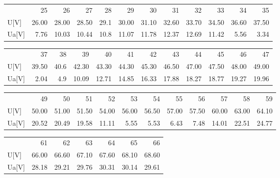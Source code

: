 \documentclass[a4paper,10pt]{article}
\begin{document}
\begin{tabular}{lrrrrrrrrrrr}

{} &     25 &     26 &     27 &    28 &     29 &     30 &     31 &     32 &     33 &     34 &     35 \\

U[V]  &  26.00 &  28.00 &  28.50 &  29.1 &  30.00 &  31.10 &  32.60 &  33.70 &  34.50 &  36.60 &  37.50 \\
Ua[V] &   7.76 &  10.03 &  10.44 &  10.8 &  11.07 &  11.78 &  12.37 &  12.69 &  11.42 &   5.56 &   3.34 \\

\end{tabular}

\begin{tabular}{lrrrrrrrrrrr}

{} &     37 &    38 &     39 &     40 &     41 &     42 &     43 &     44 &     45 &     46 &     47 \\

U[V]  &  39.50 &  40.6 &  42.30 &  43.30 &  44.30 &  45.30 &  46.50 &  47.00 &  47.50 &  48.00 &  49.00 \\
Ua[V] &   2.04 &   4.9 &  10.09 &  12.71 &  14.85 &  16.33 &  17.88 &  18.27 &  18.77 &  19.27 &  19.96 \\

\end{tabular}

\begin{tabular}{lrrrrrrrrrrr}

{} &     49 &     50 &     51 &     52 &     53 &     54 &     55 &     56 &     57 &     58 &     59 \\

U[V]  &  50.00 &  51.00 &  51.50 &  54.00 &  56.00 &  56.50 &  57.00 &  57.50 &  60.00 &  63.00 &  64.10 \\
Ua[V] &  20.52 &  20.49 &  19.58 &  11.11 &   5.55 &   5.53 &   6.43 &   7.48 &  14.01 &  22.51 &  24.77 \\

\end{tabular}

\begin{tabular}{lrrrrrr}

{} &     61 &     62 &     63 &     64 &     65 &     66 \\

U[V]  &  66.00 &  66.60 &  67.10 &  67.60 &  68.10 &  68.60 \\
Ua[V] &  28.18 &  29.21 &  29.76 &  30.31 &  30.14 &  29.61 \\

\end{tabular}
\end{document}
